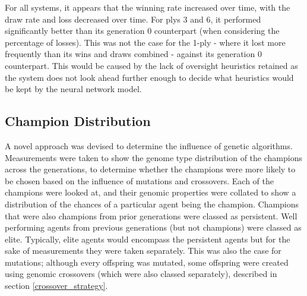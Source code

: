 \documentclass[12pt,a4paper]{article}
\begin{document}
    For all systems, it appears that the winning rate increased over time, with the draw rate and loss decreased over time. For plys 3 and 6, it performed significantly better than its generation 0 counterpart (when considering the percentage of losses). This was not the case for the 1-ply - where it lost more frequently than its wins and draws combined - against its generation 0 counterpart. This would be caused by the lack of oversight heuristics retained as the system does not look ahead further enough to decide what heuristics would be kept by the neural network model.
 
    \subsection{Champion Distribution}
        A novel approach was devised to determine the influence of genetic algorithms. Measurements were taken to show the genome type distribution of the champions across the generations, to determine whether the champions were more likely to be chosen based on the influence of mutations and crossovers. Each of the champions were looked at, and their genomic properties were collated to show a distribution of the chances of a particular agent being the champion. Champions that were also champions from prior generations were classed as persistent. Well performing agents from previous generations (but not champions) were classed as elite. Typically, elite agents would encompass the persistent agents but for the sake of measurements they were taken separately. This was also the case for mutations; although every offspring was mutated, some offspring were created using genomic crossovers (which were also classed separately), described in section \ref{crossover_strategy}.  
\end{document}
